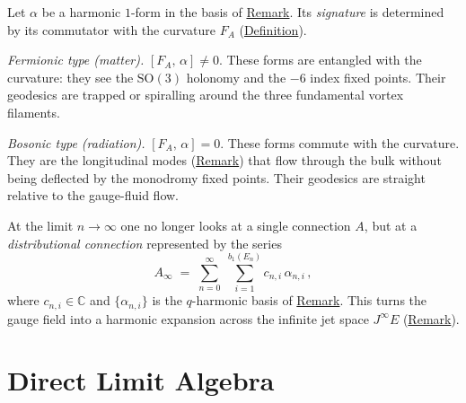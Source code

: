 \begin{remark}
  \label{rem:algebraic-filter}
Let $\alpha$ be a harmonic $1$-form in the basis of
\hyperref[rem:q-harmonic-basis-brane]{Remark}.  Its \emph{signature} is determined
by its commutator with the curvature $F_A$
(\hyperref[def:substrate-parameter]{Definition}).

\emph{Fermionic type (matter).}
$[F_A,\, \alpha] \neq 0$.  These forms are entangled with the curvature: they
see the $\mathrm{SO}(3)$ holonomy and the $-6$ index fixed points.  Their
geodesics are trapped or spiralling around the three fundamental vortex
filaments.

\emph{Bosonic type (radiation).}
$[F_A,\, \alpha] = 0$.  These forms commute with the curvature.  They are the
longitudinal modes (\hyperref[rem:weight-space-decomposition]{Remark}) that flow
through the bulk without being deflected by the monodromy fixed points.  Their
geodesics are straight relative to the gauge-fluid flow.
\end{remark}

\begin{remark}
  \label{rem:distributional-connection}
At the limit $n \to \infty$ one no longer looks at a single connection $A$,
but at a \emph{distributional connection} represented by the series
\[
A_\infty
  \;=\;
  \sum_{n=0}^{\infty}\;\sum_{i=1}^{b_1(E_n)}
  c_{n,i}\,\alpha_{n,i}\,,
\]
where $c_{n,i} \in \mathbb{C}$ and $\{\alpha_{n,i}\}$ is the $q$-harmonic
basis of \hyperref[rem:q-harmonic-basis-brane]{Remark}.  This turns the gauge field
into a harmonic expansion across the infinite jet space $J^\infty E$
(\hyperref[rem:jet-shell]{Remark}).
\end{remark}

\section{Direct Limit Algebra}
\label{sec:direct-limit}

